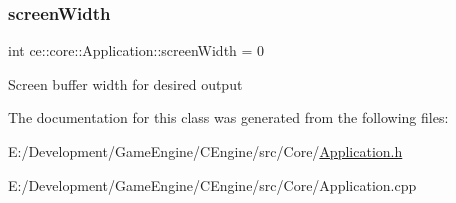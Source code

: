 \subsubsection{\texorpdfstring{screen\+Width}{screenWidth}}
{\footnotesize\ttfamily int ce\+::core\+::\+Application\+::screen\+Width = 0}

Screen buffer width for desired output 

The documentation for this class was generated from the following files\+:\begin{DoxyCompactItemize}
\item 
E\+:/\+Development/\+Game\+Engine/\+C\+Engine/src/\+Core/\hyperlink{_application_8h}{Application.\+h}\item 
E\+:/\+Development/\+Game\+Engine/\+C\+Engine/src/\+Core/Application.\+cpp\end{DoxyCompactItemize}
